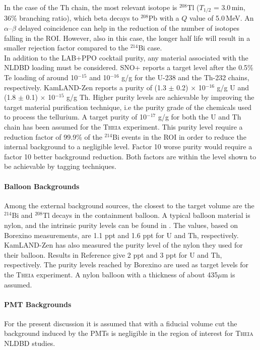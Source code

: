 In the case of the Th chain, the most relevant isotope is $^{208}$Tl
($T_{1/2}$ = 3.0\,min, 36\% branching ratio), which beta decays to $^{208}$Pb
with a $Q$ value of 5.0\,MeV. An $\alpha$--$\beta$ delayed coincidence can
help in the reduction of the number of isotopes falling in the ROI. However,
also in this case, the longer half life will result in a smaller rejection
factor compared to the $^{214}$Bi case.\\

In addition to the LAB+PPO cocktail purity, any material associated with the
NLDBD loading must be considered. SNO+ reports a target level after the
0.5\% Te loading of around 10$^{-15}$ and
10$^{-16}$ g/g for the U-238 and the Th-232 chains, respectively.
KamLAND-Zen \cite{gando13} reports a purity of 
(1.3 $\pm$ 0.2) $\times$ 10$^{-16}$ g/g U and
(1.8 $\pm$ 0.1) $\times$ 10$^{-15}$ g/g Th.
Higher purity levels are achievable by improving the target
material purification technique, i.e the purity grade of the chemicals used to process the tellurium. A target purity of 10$^{-17}$ g/g for both the U and Th chain has been
assumed for the \textsc{Theia} experiment. This purity level require a reduction factor of 99.9\% of the $^{214}$Bi events in the ROI in order to reduce the internal background to a negligible level. Factor 10 worse purity would require a factor 10 better background reduction. Both factors are within the level shown to be achievable by tagging techniques.

\paragraph{Balloon Backgrounds}
Among the external background sources, the closest to the target volume are
the $^{214}$Bi and $^{208}$Tl decays in the containment balloon. A typical
balloon material is nylon, and the intrinsic purity levels can be found in
\cite{radiopurityorg}. The values, based on Borexino measurements, are
1.1 ppt and 1.6 ppt for U and Th, respectively. KamLAND-Zen has also measured
the purity level of the nylon they used for their balloon. Results
in Reference \cite{kamLAND_Zen} give 2 ppt and 3 ppt for U and Th, respectively.
The purity levels reached by Borexino are used as target levels for the
\textsc{Theia} experiment. A nylon balloon with a thickness of about 435$\mu$m is assumed.

\paragraph{PMT Backgrounds}
For the present discussion it is assumed that with a fiducial volume cut the
background induced by the PMTs is negligible in the region of interest for
\textsc{Theia} NLDBD studies.

